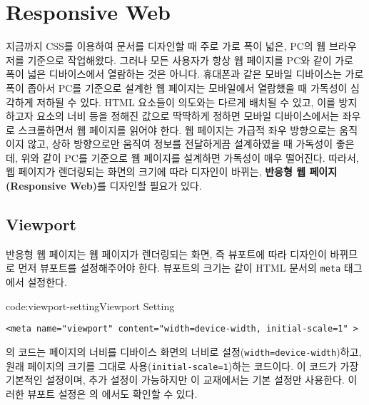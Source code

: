 \section{Responsive Web} \label{sect:responsive-web}

지금까지 CSS를 이용하여 문서를 디자인할 때 주로 가로 폭이 넓은, PC의 웹 브라우저를 기준으로 작업해왔다. 그러나 모든 사용자가 항상 웹 페이지를 PC와 같이 가로 폭이 넓은 디바이스에서 열람하는 것은 아니다. 휴대폰과 같은 모바일 디바이스는 가로 폭이 좁아서 PC를 기준으로 설계한 웹 페이지는 모바일에서 열람했을 때 가독성이 심각하게 저하될 수 있다. HTML 요소들이 의도와는 다르게 배치될 수 있고, 이를 방지하고자 요소의 너비 등을 정해진 값으로 딱딱하게 정하면 모바일 디바이스에서는 좌우로 스크롤하면서 웹 페이지를 읽어야 한다. 웹 페이지는 가급적 좌우 방향으로는 움직이지 않고, 상하 방향으로만 움직여 정보를 전달하게끔 설계하였을 때 가독성이 좋은데, 위와 같이 PC를 기준으로 웹 페이지를 설계하면 가독성이 매우 떨어진다. 따라서, 웹 페이지가 렌더링되는 화면의 크기에 따라 디자인이 바뀌는, \textbf{반응형 웹 페이지(Responsive Web)}를 디자인할 필요가 있다.


\subsection*{Viewport}
반응형 웹 페이지는 웹 페이지가 렌더링되는 화면, 즉 뷰포트에 따라 디자인이 바뀌므로 먼저 뷰포트를 설정해주어야 한다. 뷰포트의 크기는 \과 같이 HTML 문서의 \texttt{meta} 태그에서 설정한다.

\begin{codeenv}{code:viewport-setting}{Viewport Setting}\begin{verbatim}
<meta name="viewport" content="width=device-width, initial-scale=1" >
\end{verbatim}
\end{codeenv}

의 코드는 페이지의 너비를 디바이스 화면의 너비로 설정(\texttt{width=device-width})하고, 원래 페이지의 크기를 그대로 사용(\texttt{initial-scale=1})하는 코드이다. 이 코드가 가장 기본적인 설정이며, 추가 설정이 가능하지만 이 교재에서는 기본 설정만 사용한다. 이러한 뷰포트 설정은 의 에서도 확인할 수 있다.

